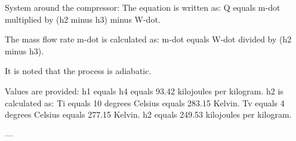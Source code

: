 System around the compressor:  
The equation is written as:  
Q equals m-dot multiplied by (h2 minus h3) minus W-dot.  

The mass flow rate m-dot is calculated as:  
m-dot equals W-dot divided by (h2 minus h3).  

It is noted that the process is adiabatic.  

Values are provided:  
h1 equals h4 equals 93.42 kilojoules per kilogram.  
h2 is calculated as:  
Ti equals 10 degrees Celsius equals 283.15 Kelvin.  
Tv equals 4 degrees Celsius equals 277.15 Kelvin.  
h2 equals 249.53 kilojoules per kilogram.  

---